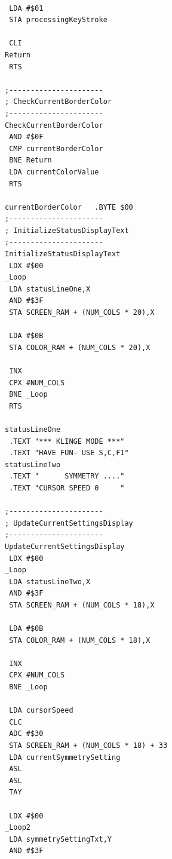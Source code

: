 \vfill
\begin{minipage}[b]{0.33\linewidth}
\begin{lrbox}{\mybox}%
\begin{lstlisting}[basicstyle=\ttfamily\tiny]

 LDA #$01
 STA processingKeyStroke

 CLI 
Return   
 RTS 

;----------------------
; CheckCurrentBorderColor
;----------------------
CheckCurrentBorderColor   
 AND #$0F
 CMP currentBorderColor
 BNE Return
 LDA currentColorValue
 RTS 

currentBorderColor   .BYTE $00
;----------------------
; InitializeStatusDisplayText
;----------------------
InitializeStatusDisplayText   
 LDX #$00
_Loop
 LDA statusLineOne,X
 AND #$3F
 STA SCREEN_RAM + (NUM_COLS * 20),X

 LDA #$0B
 STA COLOR_RAM + (NUM_COLS * 20),X

 INX 
 CPX #NUM_COLS
 BNE _Loop
 RTS 

statusLineOne
 .TEXT "*** KLINGE MODE ***"
 .TEXT "HAVE FUN- USE S,C,F1"
statusLineTwo
 .TEXT "      SYMMETRY ...."
 .TEXT "CURSOR SPEED 0     "

;----------------------
; UpdateCurrentSettingsDisplay
;----------------------
UpdateCurrentSettingsDisplay   
 LDX #$00
_Loop   
 LDA statusLineTwo,X
 AND #$3F
 STA SCREEN_RAM + (NUM_COLS * 18),X

 LDA #$0B
 STA COLOR_RAM + (NUM_COLS * 18),X

 INX 
 CPX #NUM_COLS
 BNE _Loop

 LDA cursorSpeed
 CLC 
 ADC #$30
 STA SCREEN_RAM + (NUM_COLS * 18) + 33
 LDA currentSymmetrySetting
 ASL 
 ASL 
 TAY 

 LDX #$00
_Loop2 
 LDA symmetrySettingTxt,Y
 AND #$3F
\end{lstlisting}
\end{lrbox}%
\scalebox{0.8}{\usebox{\mybox}}
\end{minipage}
\hspace{0.5cm}
